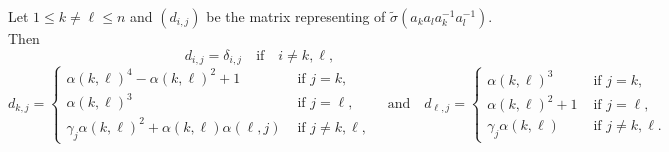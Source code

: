 \documentclass[10pt,a4paper]{amsart}
\begin{document}
\begin{lemma}\label{prod matrix square}
Let $1 \le k\neq \ell \le n$  and $(d_{i,j})$ be the matrix representing of $\tilde{\sigma}(a_ka_la_k^{-1}a_l^{-1})$. Then 
$$d_{i,j}=\delta_{i,j} \quad \textrm{if} \quad i\neq k,\ell, $$
$$
d_{k,j}=\begin{cases}
      \alpha(k,\ell)^4-\alpha(k,\ell)^2+1 & \text{ if } j=k,\\
      \alpha(k,\ell)^3 & \text{ if }  j=\ell,\\
	\gamma_j\alpha(k,\ell)^2+\alpha(k,\ell)\alpha(\ell,j)  & \text{ if }  j\neq k ,\ell,
\end{cases}
\quad \textrm{and} \quad 
d_{\ell,j}=\begin{cases}
        \alpha(k,\ell)^3  &\text { if } j=k,\\
		\alpha(k,\ell)^2 + 1  &\text { if } j=\ell, \\
		\gamma_j\alpha(k,\ell)	 &\text { if } j\neq k, \ell.
      \end{cases}
$$


\end{lemma}
\end{document}
